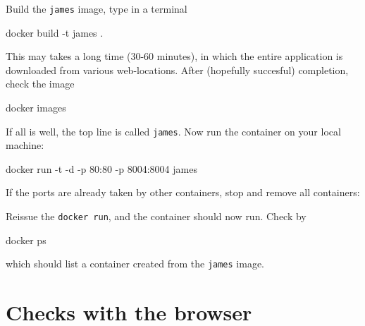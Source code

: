 \documentclass[]{book}
\newenvironment{Shaded}{\begin{snugshade}}{\end{snugshade}}
\newcommand{\ExtensionTok}[1]{#1}
\newcommand{\NormalTok}[1]{#1}
\newcommand{\VariableTok}[1]{\textcolor[rgb]{0.00,0.00,0.00}{#1}}
\begin{document}
Build the \texttt{james} image, type in a terminal

\begin{Shaded}
\begin{Highlighting}[]
\ExtensionTok{docker}\NormalTok{ build -t james .}
\end{Highlighting}
\end{Shaded}

This may takes a long time (30-60 minutes), in which the entire application is downloaded from various web-locations. After (hopefully succesful) completion, check the image

\begin{Shaded}
\begin{Highlighting}[]
\ExtensionTok{docker}\NormalTok{ images}
\end{Highlighting}
\end{Shaded}

If all is well, the top line is called \texttt{james}. Now run the container on your local machine:

\begin{Shaded}
\begin{Highlighting}[]
\ExtensionTok{docker}\NormalTok{ run -t -d -p 80:80 -p 8004:8004 james}
\end{Highlighting}
\end{Shaded}

If the ports are already taken by other containers, stop and remove all containers:

\begin{Shaded}
\end{Shaded}

Reissue the \texttt{docker\ run}, and the container should now run. Check by

\begin{Shaded}
\begin{Highlighting}[]
\ExtensionTok{docker}\NormalTok{ ps}
\end{Highlighting}
\end{Shaded}

which should list a container created from the \texttt{james} image.

\hypertarget{checks-with-the-browser}{%
\section{Checks with the browser}\label{checks-with-the-browser}}
\end{document}
